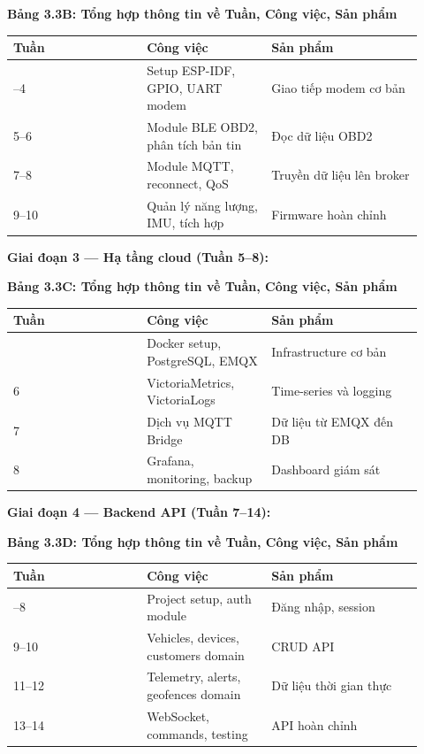 \documentclass[13pt,a4paper]{extarticle}
\newcounter{none} %
\newcommand{\thesislongtableorignewline}{}
\let\thesislongtableorignewline\\
\renewcommand{\\}{\thesislongtableorignewline\hline}%
\let\\\thesislongtableorignewline
\newcommand{\thesistabletitle}[1]{%
  \begin{center}\textbf{#1}\end{center}%
}
\begin{document}
{\def\LTcaptype{none} %
\thesistabletitle{Bảng 3.3B: Tổng hợp thông tin về Tuần, Công việc, Sản phẩm}

\begin{longtable}{|p{0.30\linewidth}|p{0.28\linewidth}|p{0.34\linewidth}|}
\hline \textbf{Tuần} & \textbf{Công việc} & \textbf{Sản phẩm} \\
\hline
\endhead
\hline
\endlastfoot
3--4 & Setup ESP-IDF, GPIO, UART modem & Giao tiếp modem cơ bản \\
5--6 & Module BLE OBD2, phân tích bản tin & Đọc dữ liệu OBD2 \\
7--8 & Module MQTT, reconnect, QoS & Truyền dữ liệu lên broker \\
9--10 & Quản lý năng lượng, IMU, tích hợp & Firmware hoàn chỉnh \\
\end{longtable}
}

\textbf{Giai đoạn 3 --- Hạ tầng cloud (Tuần 5--8):}

{\def\LTcaptype{none} %
\thesistabletitle{Bảng 3.3C: Tổng hợp thông tin về Tuần, Công việc, Sản phẩm}

\begin{longtable}{|p{0.30\linewidth}|p{0.28\linewidth}|p{0.34\linewidth}|}
\hline \textbf{Tuần} & \textbf{Công việc} & \textbf{Sản phẩm} \\
\hline
\endhead
\hline
\endlastfoot
5 & Docker setup, PostgreSQL, EMQX & Infrastructure cơ bản \\
6 & VictoriaMetrics, VictoriaLogs & Time-series và logging \\
7 & Dịch vụ MQTT Bridge & Dữ liệu từ EMQX đến DB \\
8 & Grafana, monitoring, backup & Dashboard giám sát \\
\end{longtable}
}

\textbf{Giai đoạn 4 --- Backend API (Tuần 7--14):}

{\def\LTcaptype{none} %
\thesistabletitle{Bảng 3.3D: Tổng hợp thông tin về Tuần, Công việc, Sản phẩm}

\begin{longtable}{|p{0.30\linewidth}|p{0.28\linewidth}|p{0.34\linewidth}|}
\hline \textbf{Tuần} & \textbf{Công việc} & \textbf{Sản phẩm} \\
\hline
\endhead
\hline
\endlastfoot
7--8 & Project setup, auth module & Đăng nhập, session \\
9--10 & Vehicles, devices, customers domain & CRUD API \\
11--12 & Telemetry, alerts, geofences domain & Dữ liệu thời gian thực \\
13--14 & WebSocket, commands, testing & API hoàn chỉnh \\
\end{longtable}
}
\end{document}
